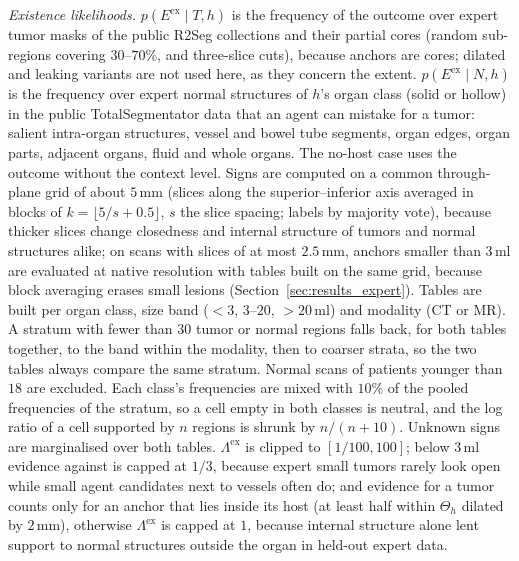 \documentclass[fleqn,10pt]{olplainarticle}
\begin{document}
\emph{Existence likelihoods.} $p(E^{\mathrm{ex}}\mid T,h)$ is the frequency of the outcome over expert tumor masks of the
public R2Seg collections and their partial cores (random sub-regions covering $30$--$70\%$, and three-slice cuts), because
anchors are cores; dilated and leaking variants are not used here, as they concern the extent. $p(E^{\mathrm{ex}}\mid N,h)$ is
the frequency over expert normal structures of $h$'s organ class (solid or hollow) in the public TotalSegmentator data that
an agent can mistake for a tumor: salient intra-organ structures, vessel and bowel tube segments, organ edges, organ parts,
adjacent organs, fluid and whole organs. The no-host case uses the outcome without the context level. Signs are computed on a
common through-plane grid of about $5$\,mm (slices along the superior--inferior axis averaged in blocks of
$k=\lfloor5/s+0.5\rfloor$, $s$ the slice spacing; labels by majority vote), because thicker slices change closedness and
internal structure of tumors and normal structures alike; on scans with slices of at most $2.5$\,mm, anchors smaller than
$3$\,ml are evaluated at native resolution with tables built on the same grid, because block averaging erases small
lesions (Section~\ref{sec:results_expert}). Tables are built per organ class, size band ($<3$, $3$--$20$, $>20$\,ml) and
modality (CT or MR). A stratum with fewer than $30$ tumor or normal regions falls back, for both tables together, to the band
within the modality, then to coarser strata, so the two tables always compare the same stratum. Normal scans of patients
younger than $18$ are excluded. Each class's frequencies are mixed with $10\%$ of the pooled frequencies of the stratum, so a
cell empty in both classes is neutral, and the log ratio of a cell supported by $n$ regions is shrunk by $n/(n+10)$. Unknown
signs are marginalised over both tables. $\Lambda^{\mathrm{ex}}$ is clipped to $[1/100,100]$; below $3$\,ml evidence against
is capped at $1/3$, because expert small tumors rarely look open while small agent candidates next to vessels often do; and
evidence for a tumor counts only for an anchor that lies inside its host (at least half within $\Theta_h$ dilated by $2$\,mm),
otherwise $\Lambda^{\mathrm{ex}}$ is capped at $1$, because internal structure alone lent support to normal structures
outside the organ in held-out expert data.
\end{document}
